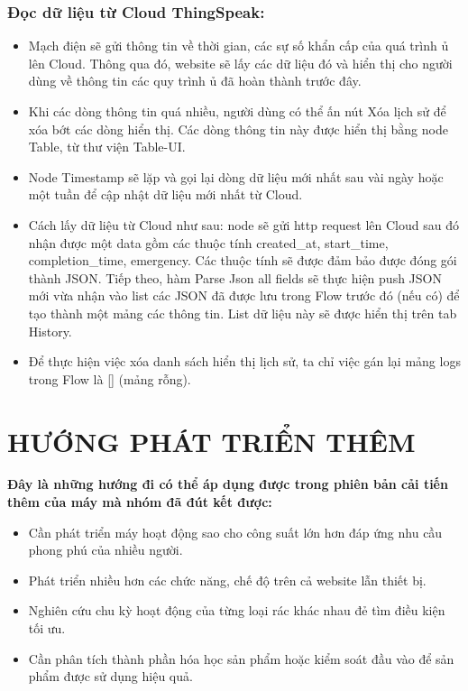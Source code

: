 \documentclass[12pt, a4paper]{article}
\begin{document}
\subsubsection{Đọc dữ liệu từ Cloud ThingSpeak:} 
        \begin{itemize}
            \item Mạch điện sẽ gửi thông tin về thời gian, các sự số khẩn cấp của quá trình ủ lên Cloud. Thông qua đó, website sẽ lấy các dữ liệu đó và hiển thị cho người dùng về thông tin các quy trình ủ đã hoàn thành trước đây.
            \item Khi các dòng thông tin quá nhiều, người dùng có thể ấn nút Xóa lịch sử để xóa bớt các dòng hiển thị. Các dòng thông tin này được hiển thị bằng node Table, từ thư viện Table-UI.
            \item Node Timestamp sẽ lặp và gọi lại dòng  dữ liệu mới nhất sau vài ngày hoặc một tuần để cập nhật dữ liệu mới nhất từ Cloud.
            \item Cách lấy dữ liệu từ Cloud như sau: node sẽ gửi http request lên Cloud sau đó nhận được một data gồm các thuộc tính created\_at, start\_time, completion\_time, emergency. Các thuộc tính sẽ được đảm bảo được đóng gói thành JSON. Tiếp theo, hàm Parse Json all fields sẽ thực hiện push JSON mới vừa nhận vào list các JSON đã được lưu trong Flow trước đó (nếu có) để tạo thành một mảng các thông tin. List dữ liệu này sẽ được hiển thị trên tab History. 
            \item Để thực hiện việc xóa danh sách hiển thị lịch sử, ta chỉ việc gán lại mảng logs trong Flow là [] (mảng rỗng).
        \end{itemize}



\section{HƯỚNG PHÁT TRIỂN THÊM}
\textbf{Đây là những hướng đi có thể áp dụng được trong phiên bản cải tiến thêm của máy mà nhóm đã đút kết được: }
\begin{itemize}
    \item Cần phát triển máy hoạt động sao cho công suất lớn hơn đáp ứng nhu cầu phong phú của nhiều người.
    \item Phát triển nhiều hơn các chức năng, chế độ trên cả website lẫn thiết bị.
    \item Nghiên cứu chu kỳ hoạt động của từng loại rác khác nhau đẻ tìm điều kiện tối ưu.
    \item Cần phân tích thành phần hóa học sản phẩm hoặc kiểm soát đầu vào để sản phẩm được sử dụng hiệu quả.

\end{itemize}
\end{document}
